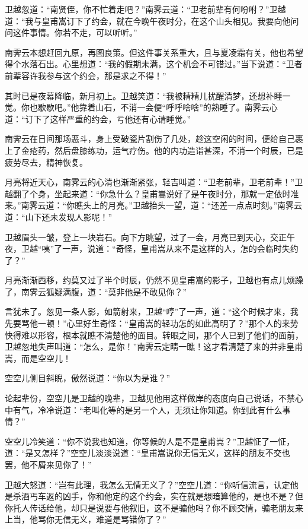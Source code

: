 \documentclass[12pt,oneside]{book}
\begin{document}
卫越忽道：``南贤侄，你不忙着走吧？''南霁云道：``卫老前辈有何吩咐？''卫越道：``我与皇甫嵩订下了约会，就在今晚午夜时分，在这个山头相见。我要向他问问这件事情。你若不走，可以听听。''

南霁云本想赶回九原，再图良策。但这件事关系重大，且与夏凌霜有关，他也希望得个水落石出。心里想道：``我的假期未满，这个机会不可错过。''当下说道：``卫者前辈容许我参与这个约会，那是求之不得！''

其时已是夜幕降临，新月初上。卫越笑道：``我被精精儿扰醒清梦，还想补睡一觉。你也歇歇吧。''他靠着山石，不消一会便``呼呼啥啥''的熟睡了。南霁云心道：``订下了这样严重的约会，亏他还有心请睡觉。''

南霁云在日间那场恶斗，身上受破瓷片割伤了几处，趁这空闲的时间，便给自己裹上了金疮药，然后盘膝练功，运气疗伤。他的内功造诣甚深，不消一个时辰，已是疲劳尽去，精神恢复。

月亮将近天心，南霁云的心清也渐渐紧张，轻吉叫道：``卫老前辈，卫老前辈！''卫越翻了个身，坐起来道：``你急什么？皇甫嵩说好了是午夜时分，那就一定依时准来。''南霁云道：``你瞧头上的月亮。''卫越抬头一望，道：``还差一点点时刻。''南霁云道：``山下还未发现人影呢！''

卫越眉头一皱，登上一块岩石。向下方眺望，过了一会，月亮已到天心，交正午夜，卫越``咦''了一声，说道：``奇怪，皇甫嵩从来不是这样的人，怎的会临时失约了？''

月亮渐渐西移，约莫又过了半个时辰，仍然不见皇甫嵩的影子，卫越也有点儿烦躁了，南霁云狐疑满腹，道：``莫非他是不敢见你？''

言犹未了。忽见一条人影，如箭射来，卫越``哼''了一声，道：``这个时候才来，我先要骂他一顿！''心里好生奇怪：``皇甫嵩的轻功怎的如此高明了？''那个人的来势快得难以形容，根本就瞧不清楚他的面目。转眼之间，那个人已到了他们的面前，卫越忽地失声叫道：``怎么，是你！''南霁云定睛一瞧！这才看清楚了来的并非皇甫嵩，而是空空儿！

空空儿侧目斜睨，傲然说道：``你以为是谁？''

论起辈份，空空儿是卫越的晚辈，卫越见他用这样做岸的态度向自己说话，不禁心中有气，冷冷说道：``老叫化等的是另一个人，无须让你知道。你到此有什么事情？''

空空儿冷笑道：``你不说我也知道，你等候的人是不是皇甫嵩？''卫越怔了一怔，道：``是又怎样？''空空儿淡淡说道：``皇甫嵩说你无信无义，这样的朋友不交也罢，他不屑来见你了！''

卫越大怒道：``岂有此理，我怎么无情无义了？''空空儿道：``你听信流言，认定他是杀酒丐车返的凶手，你和他定的这个约会，实在就是想暗算他的，是也不是？但你托人传话给他，却只是说要与他叙旧，这不是骗他吗？你不顾交情，骗老朋友来上当，他骂你无信无义，难道是骂错你了？''
\end{document}
